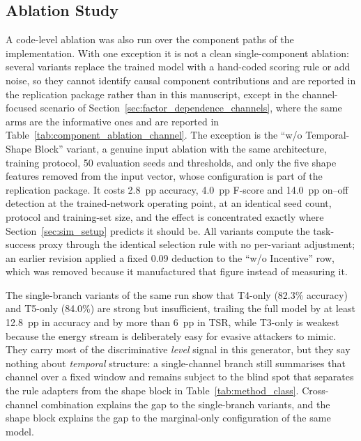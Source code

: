 \documentclass[notspecified,article,submit,moreauthors]{Definitions/mdpi}
\begin{document}
\subsection{Ablation Study}
\label{sec:ablation}
A code-level ablation was also run over the component paths of the implementation. With one exception it is not a clean single-component ablation: several variants replace the trained model with a hand-coded scoring rule or add noise, so they cannot identify causal component contributions and are reported in the replication package rather than in this manuscript, except in the channel-focused scenario of Section~\ref{sec:factor_dependence_channels}, where the same arms are the informative ones and are reported in Table~\ref{tab:component_ablation_channel}. The exception is the ``w/o Temporal-Shape Block'' variant, a genuine input ablation with the same architecture, training protocol, 50 evaluation seeds and thresholds, and only the five shape features removed from the input vector, whose configuration is part of the replication package. It costs 2.8~pp accuracy, 4.0~pp F-score and 14.0~pp on--off detection at the trained-network operating point, at an identical seed count, protocol and training-set size, and the effect is concentrated exactly where Section~\ref{sec:sim_setup} predicts it should be. All variants compute the task-success proxy through the identical selection rule with no per-variant adjustment; an earlier revision applied a fixed 0.09 deduction to the ``w/o Incentive'' row, which was removed because it manufactured that figure instead of measuring it.

The single-branch variants of the same run show that T4-only (82.3\% accuracy) and T5-only (84.0\%) are strong but insufficient, trailing the full model by at least 12.8~pp in accuracy and by more than 6~pp in TSR, while T3-only is weakest because the energy stream is deliberately easy for evasive attackers to mimic. They carry most of the discriminative \emph{level} signal in this generator, but they say nothing about \emph{temporal} structure: a single-channel branch still summarises that channel over a fixed window and remains subject to the blind spot that separates the rule adapters from the shape block in Table~\ref{tab:method_class}. Cross-channel combination explains the gap to the single-branch variants, and the shape block explains the gap to the marginal-only configuration of the same model.
\end{document}
